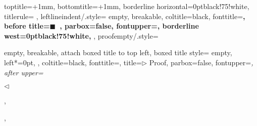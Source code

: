 {{    toptitle=\aboverulesep+1mm,
    bottomtitle=\belowrulesep+1mm,
    borderline horizontal={\heavyrulewidth}{0pt}{black!75!white},
    titlerule=\lightrulewidth%
  },
  leftlineindent/.style={
    empty,
    breakable,
    coltitle=black,
    fonttitle=\sffamily\bfseries,
    before title={\(\blacksquare{}\)~},
    parbox=false,
    fontupper=\sffamily,
    borderline west={\heavyrulewidth}{0pt}{black!75!white},
  },
  proofempty/.style={
    empty,
    breakable,
    attach boxed title to top left,
    boxed title style={
      empty,
      left*=0pt,
    },
    coltitle=black,
    fonttitle=\sffamily,
    title=\(\rhd{}\) Proof,
    parbox=false,
    fontupper=\itshape,
    after upper={\par\hfill \(\lhd{}\)},
  },
}

